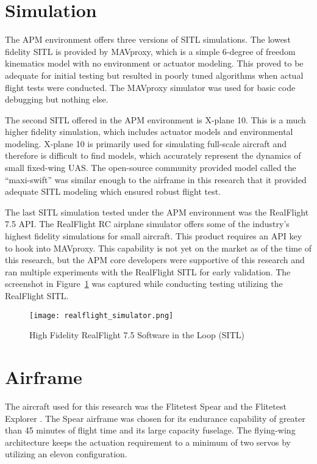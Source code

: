 \section{Simulation}
The \ac{APM} environment offers three versions of \ac{SITL} simulations.  The lowest fidelity \ac{SITL} is provided by MAVproxy, which is a simple 6-degree of freedom kinematics model with no environment or actuator modeling.  This proved to be adequate for initial testing but resulted in poorly tuned algorithms when actual flight tests were conducted.  The MAVproxy simulator was used for basic code debugging but nothing else.

The second \ac{SITL} offered in the \ac{APM} environment is X-plane 10.  This is a much higher fidelity simulation, which includes actuator models and environmental modeling.  X-plane 10 is primarily used for simulating full-scale aircraft and therefore is difficult to find models, which accurately represent the dynamics of small fixed-wing \ac{UAS}.  The open-source community provided model called the \enquote{maxi-swift} was similar enough to the airframe in this research that it provided adequate \ac{SITL} modeling which ensured robust flight test.

The last \ac{SITL} simulation tested under the \ac{APM} environment was the RealFlight 7.5 \ac{API}.  The RealFlight \ac{RC} airplane simulator offers some of the industry's highest fidelity simulations for small aircraft.  This product requires an \ac{API} key to hook into MAVproxy.  This capability is not yet on the market as of the time of this research, but the \ac{APM} core developers were supportive of this research and ran multiple experiments with the RealFlight \ac{SITL} for early validation.  The screenshot in Figure~\ref{fig:realflight_sitl} was captured while conducting testing utilizing the RealFlight \ac{SITL}.

\begin{figure}[h!]
 \centering
  \texttt{[image: realflight\_simulator.png]}
  \caption{High Fidelity RealFlight 7.5 Software in the Loop (SITL)}
  \label{fig:realflight_sitl}
\end{figure}


\section{Airframe}

The aircraft used for this research was the Flitetest Spear and the Flitetest Explorer \cite{flitetest}.  The Spear airframe was chosen for its endurance capability of greater than 45 minutes of flight time and its large capacity fuselage.  The flying-wing architecture keeps the actuation requirement to a minimum of two servos by utilizing an elevon configuration.

